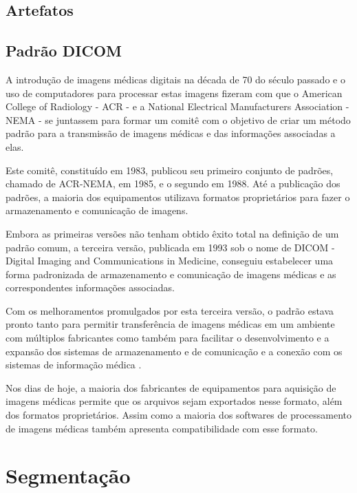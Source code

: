 \subsection{Artefatos}


\subsection{Padrão DICOM}

A introdução de imagens médicas digitais na década de 70 do século passado e o uso de computadores para processar estas imagens fizeram com que o American College of Radiology - ACR - e a National Electrical Manufacturers Association - NEMA - se juntassem para formar um comitê com o objetivo de criar um método padrão para a transmissão de imagens médicas e das informações associadas a elas.

Este comitê, constituído em 1983, publicou seu primeiro conjunto de padrões, chamado de ACR-NEMA, em 1985, e o segundo em 1988. Até a publicação dos padrões, a maioria dos equipamentos utilizava formatos proprietários para fazer o armazenamento e comunicação de imagens.

Embora as primeiras versões não tenham obtido êxito total na definição de um padrão comum, a terceira versão, publicada em 1993 sob o nome de DICOM - Digital Imaging and Communications in Medicine, conseguiu estabelecer uma forma padronizada de armazenamento e comunicação de imagens médicas e as correspondentes informações associadas.

Com os melhoramentos promulgados por esta terceira versão, o padrão estava pronto tanto para permitir transferência de imagens médicas em um ambiente com múltiplos fabricantes como também para facilitar o desenvolvimento e a expansão dos sistemas de armazenamento e de comunicação e a conexão com os sistemas de informação médica \cite{nema}.

Nos dias de hoje, a maioria dos fabricantes de equipamentos para aquisição de imagens médicas permite que os arquivos sejam exportados nesse formato, além dos formatos proprietários. Assim como a maioria dos softwares de processamento de imagens médicas também apresenta compatibilidade com esse formato.

\section{Segmentação}

